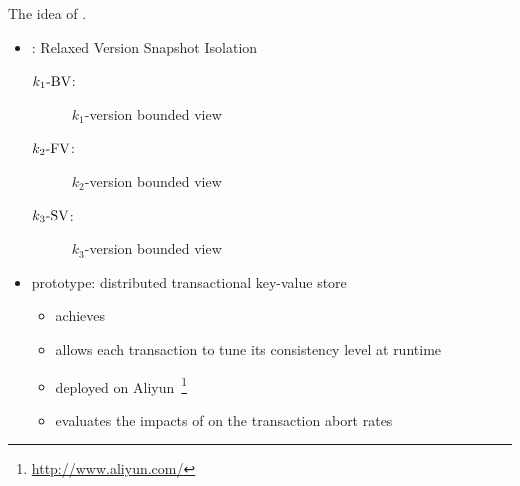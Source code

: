 \begin{frame}{}
  The idea of .

  \vspace{0.50cm}
  \begin{itemize}
    \setlength{\itemsep}{10pt}
    \item \rvsi{}: Relaxed Version Snapshot Isolation
      \begin{description}
	\item[$k_1\text{-BV}$:] $k_1$-version bounded \emph{} view
	\item[$k_2\text{-FV}$:] $k_2$-version bounded \emph{} view
	\item[$k_3\text{-SV}$:] $k_3$-version bounded \emph{} view
      \end{description}
    \pause
    \item \chameleon{} prototype: distributed transactional key-value store
      \begin{itemize}
	\item achieves \rvsi{}
	\item allows each transaction to tune its consistency level at runtime
	  \pause
	\item deployed on Aliyun~\footnote{\url{http://www.aliyun.com/}}
	\item evaluates the impacts of \rvsi{} on the transaction abort rates
      \end{itemize}
  \end{itemize}
\end{frame}

